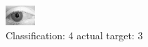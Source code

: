 \begin{figure}[h!]
\begin{center}
\includegraphics[width=0.60\columnwidth]{figures/ID2814_class_4_target_3.png}
\end{center}
\caption{ Classification: 4 actual target: 3}
\label{fig:ID2814_class_4_target_3}
\end{figure}
